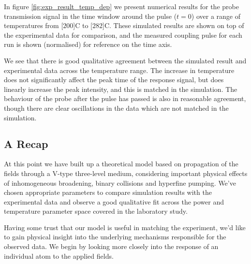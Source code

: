     In figure \ref{fig:exp_result_temp_dep} we present numerical results for the
    probe transmission signal in the time window around the pulse ($t\!=\!0$)
    over a range of temperatures from \unit[$200$]{\textdegree C} to
    \unit[$282$]{\textdegree C}. These simulated results are shown on top of the
    experimental data for comparison, and the measured coupling pulse for each
    run is shown (normalised) for reference on the time axis.

    We see that there is good qualitative agreement between the simulated result
    and experimental data across the temperature range. The increase in
    temperature does not significantly affect the peak time of the response
    signal, but does linearly increase the peak intensity, and this is matched
    in the simulation. The behaviour of the probe after the pulse has passed is
    also in reasonable agreement, though there are clear oscillations in the
    data which are not matched in the simulation.

  \subsection{A Recap}

    At this point we have built up a theoretical model based on propagation of
    the fields through a V-type three-level medium, considering important
    physical effects of inhomogeneous broadening, binary collisions and
    hyperfine pumping. We've chosen appropriate parameters to compare simulation
    results with the experimental data and observe a good qualitative fit across the power and temperature parameter space covered in the laboratory study.

    Having some trust that our model is useful in matching the experiment, we'd like to gain physical insight into the underlying mechanisms responsible
    for the observed data. We begin by looking more closely into the response of an individual atom to the applied fields.
